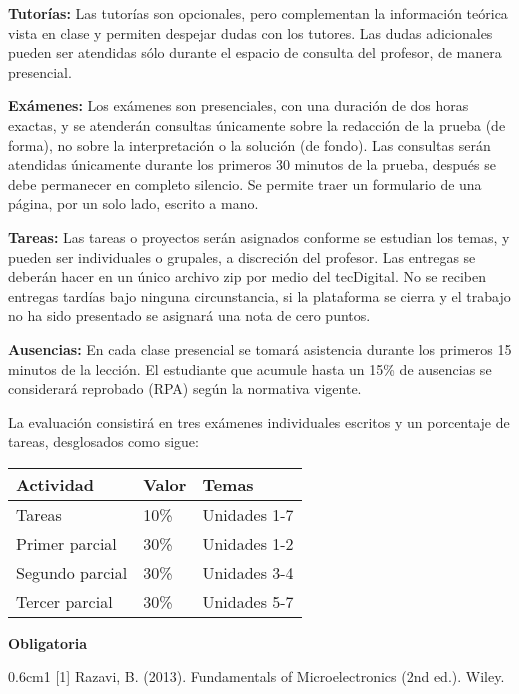 \documentclass[11pt,oneside,letterpaper]{article}
\begin{document}
\textbf{Tutorías:} Las tutorías son opcionales, pero complementan la información teórica vista en clase y permiten despejar dudas con los tutores. Las dudas adicionales pueden ser atendidas sólo durante el espacio de consulta del profesor, de manera presencial.

\textbf{Exámenes:} Los exámenes son presenciales, con una duración de dos horas exactas, y se atenderán consultas únicamente sobre la redacción de la prueba (de forma), no sobre la interpretación o la solución (de fondo). Las consultas serán atendidas únicamente durante los primeros 30 minutos de la prueba, después se debe permanecer en completo silencio. Se permite traer un formulario de una página, por un solo lado, escrito a mano.

\textbf{Tareas:} Las tareas o proyectos serán asignados conforme se estudian los temas, y pueden ser individuales o grupales, a discreción del profesor. Las entregas se deberán hacer en un único archivo zip por medio del tecDigital. No se reciben entregas tardías bajo ninguna circunstancia, si la plataforma se cierra y el trabajo no ha sido presentado se asignará una nota de cero puntos.

\textbf{Ausencias:} En cada clase presencial se tomará asistencia durante los primeros 15 minutos de la lección. El estudiante que acumule hasta un 15\% de ausencias se considerará reprobado (RPA) según la normativa vigente. 

%
La evaluación consistirá en tres exámenes individuales escritos y un porcentaje de tareas, desglosados como sigue:

\vspace{5mm}
\begin{table}[H]
\centering
\begin{tabular}{lll}
  \hline \textbf{Actividad} & \textbf{Valor} & \textbf{Temas} \\
  \hline Tareas    & 10\% & Unidades 1-7  \\
  Primer parcial   & 30\% & Unidades 1-2  \\
  Segundo parcial  & 30\% & Unidades 3-4  \\
  Tercer parcial   & 30\% & Unidades 5-7  \\
  \hline 
\end{tabular}
\end{table}


\newpage
{} 
%
\textbf{Obligatoria}

\begin{hangparas}{0.6cm}{1}
[1] Razavi, B. (2013). Fundamentals of Microelectronics (2nd ed.). Wiley.
\end{hangparas}
\end{document}
